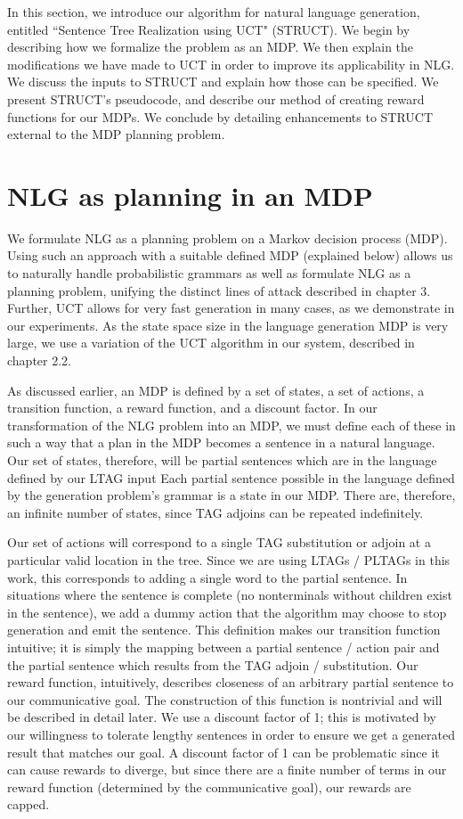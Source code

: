 In this section, we introduce our algorithm for natural language generation,
entitled ``Sentence Tree Realization using UCT" (STRUCT).  We begin
by describing how we formalize the problem as an MDP.  We then explain
the modifications we have made to UCT in order to improve
its applicability in NLG.  We discuss the inputs to STRUCT and explain
how those can be specified.  We present STRUCT's pseudocode, and describe
our method of creating reward functions for our MDPs.  We conclude by detailing
enhancements to STRUCT external to the MDP planning problem.

\section{NLG as planning in an MDP}
We formulate NLG as a planning problem on a Markov decision process
(MDP).  Using such an approach with a suitable defined MDP
(explained below) allows us to naturally handle
probabilistic grammars as well as formulate NLG as a planning problem,
unifying the distinct lines of attack described in chapter 3. Further,
UCT allows for very fast generation in
many cases, as we demonstrate in our experiments.
As the state space size in the language generation MDP is
very large, we use a variation of the UCT algorithm in our system,
described in chapter 2.2.

As discussed earlier, an MDP is defined by a set of states, a set of
actions, a transition function, a reward function, and a discount factor.
In our transformation of the NLG problem into an MDP, we must define
each of these in such a way that a plan in the MDP becomes a sentence
in a natural language.  Our set of states, therefore, will be partial
sentences which are in the language defined by our LTAG input
Each partial sentence possible in the language defined by
the generation problem's grammar is a state in our MDP.  There are,
therefore, an infinite number of states, since TAG adjoins can be
repeated indefinitely.

Our set of actions will correspond to a single
TAG substitution or adjoin at a particular valid location in the tree.
Since we are using LTAGs / PLTAGs in this work,
this corresponds to adding a single word to the partial sentence.
In situations where the sentence is complete (no nonterminals without
children exist in the sentence),
we add a dummy action that the algorithm may choose 
to stop generation and emit the sentence.
This definition makes our transition function intuitive; it is simply the
mapping between a partial sentence / action pair and the partial
sentence which results from the TAG adjoin / substitution.
Our reward function, intuitively, describes closeness of an arbitrary
partial sentence to our communicative
goal.  The construction of this function
is nontrivial and will be described in detail later.  We use a
discount factor of 1; this is motivated by our willingness to tolerate
lengthy sentences in order to ensure we get a generated result
that matches our goal.  A discount factor of 1 can be problematic
since it can cause rewards to diverge, but since there are a finite
number of terms in our reward function (determined by the communicative
goal), our rewards are capped.

